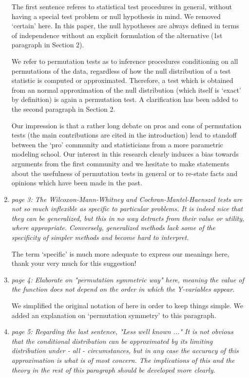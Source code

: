 \documentclass[11pt]{article}
\begin{document}
\begin{enumerate}
The first sentence referes to statistical test procedures in general,
without having a special test problem or null hypothesis in mind. We removed
`certain' here. In this paper, the null hypotheses are always defined in
terms of independence without an explicit formulation of the alternative
(1st paragraph in Section 2).

We refer to permutation tests as to inference procedures conditioning on all
permutations of the data, regardless of how the null distribution of a test
statistic is computed or approximated. Therefore, a test which is obtained
from an normal approximation of the null distribution (which itself is
`exact' by definition) is again a permutation test. A clarification has been
added to the second paragraph in Section 2.

Our impression is that a rather long debate on pros and cons of permutation
tests (the main contributions are cited in the introduction) lead to standoff
between the `pro' community and statisticians from a more parametric
modeling school. Our interest in this research clearly induces a bias
towards arguments from the first community and we hesitate to make
statements about the usefulness of permutation tests in general or to
re-state facts and opinions which have been made in the past.

\item \textsl{page 3:  The Wilcoxon-Mann-Whitney and Cochran-Mantel-Haenszel tests are not 
              so much inflexible as specific to particular problems. It is indeed nice that they 
              can be generalized, but this in no way detracts from their value or utility, where 
              appropriate. Conversely, generalized methods lack some of the specificity of 
              simpler methods and become hard to interpret.}

The term `specific' is much more adequate to express our meanings here,
thank your very much for this suggestion! 

\item \textsl{page 4:  Elaborate on "permutation symmetric way" here, meaning the value of the 
              function does not depend on the order in which the Y-variables appear.}

We simplified the original notation of \cite{StrasserWeber1999} here in
order to keep things simple. We added an explanation on `permutation
symmetry' to this paragraph.

 
\item \label{asympt} \textsl{page 5:  Regarding the last sentence, "Less well known ..." It is not obvious that 
              the conditional distribution can be approximated by its limiting distribution 
              under - all - circumstances, but in any case the accuracy of this approximation 
              is what is of most concern. The implications of this and the theory in the rest of 
              this paragraph should be developed more clearly. }


\end{enumerate}
\end{document}
